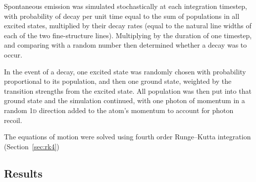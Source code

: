 Spontaneous emission was simulated stochastically at each integration timestep, with probability of decay per unit time equal to the sum of populations in all excited states, multiplied by their decay rates (equal to the natural line widths of each of the two fine-structure lines). Multiplying by the duration of one timestep, and comparing with a random number then determined whether a decay was to occur.

In the event of a decay, one excited state was randomly chosen with probability proportional to its population, and then one ground state, weighted by the transition strengths from the excited state. All population was then put into that ground state and the simulation continued, with one photon of momentum in a random \textsc{1d} direction added to the atom's momentum to account for photon recoil.

The equations of motion were solved using fourth order Runge--Kutta integration (Section~\ref{sec:rk4})

\subsection{Results}

